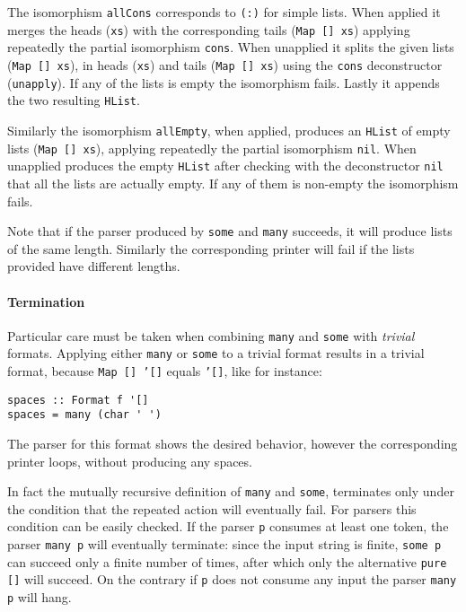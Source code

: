 \documentclass[../Thesis.tex]{subfiles}
\begin{document}

The isomorphism \texttt{allCons} corresponds to \texttt{(:)} for simple lists.
When applied it merges the heads (\texttt{xs}) with the corresponding tails (\texttt{Map [] xs}) applying repeatedly the partial isomorphism \texttt{cons}.
When unapplied it splits the given lists (\texttt{Map [] xs}), in heads (\texttt{xs}) and tails (\texttt{Map [] xs}) using the \texttt{cons} deconstructor (\texttt{unapply}). If any of the lists is empty the isomorphism fails.
Lastly it appends the two resulting \texttt{HList}.

Similarly the isomorphism \texttt{allEmpty}, when applied, produces an \texttt{HList} of empty lists (\texttt{Map [] xs}), applying repeatedly the partial isomorphism \texttt{nil}. When unapplied produces the empty \texttt{HList} after checking with the deconstructor \texttt{nil} that all the lists are actually empty. If any of them is non-empty the isomorphism fails.

Note that if the parser produced by \texttt{some} and \texttt{many} succeeds, it will produce lists of the same length. Similarly the corresponding printer will fail if the lists provided have different lengths.

\paragraph{Termination}
\label{par:Termination}
Particular care must be taken when combining \texttt{many} and \texttt{some}
with \emph{trivial} formats. Applying either \texttt{many} or \texttt{some} to a trivial format results in a trivial format, because \texttt{Map [] '[]} equals \texttt{'[]}, like for instance:
\begin{verbatim}
spaces :: Format f '[]
spaces = many (char ' ')
\end{verbatim}

The parser for this format shows the desired behavior, however the corresponding printer loops, without producing any spaces.

In fact the mutually recursive definition of \texttt{many} and \texttt{some},  terminates only under
the condition that the repeated action will eventually fail.
For parsers this condition can be easily checked.
If the parser \texttt{p} consumes at least one token, the parser \texttt{many p} will eventually terminate: since the input string is finite, \texttt{some p} 
can succeed only a finite number of times, after which only the alternative \texttt{pure []} will succeed.
On the contrary if \texttt{p} does not consume any input the parser
\texttt{many p} will hang.
\end{document}
